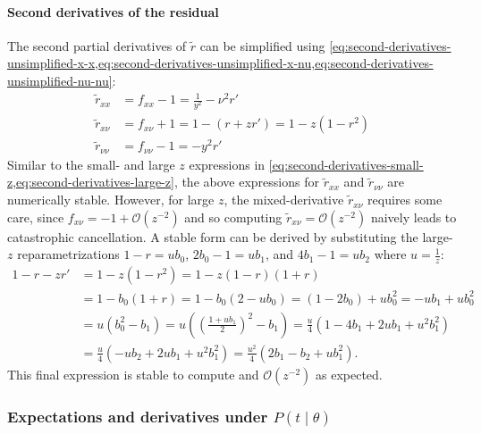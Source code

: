 \documentclass{article}
\begin{document}
\paragraph{Second derivatives of the residual}\label{sec:second-derivatives-residual}

The second partial derivatives of $\tilde{r}$ can be simplified using \cref{eq:second-derivatives-unsimplified-x-x,eq:second-derivatives-unsimplified-x-nu,eq:second-derivatives-unsimplified-nu-nu}:
%
\begin{align}
  \tilde{r}_{xx}     & = f_{xx} - 1 = \frac{1}{y^2} - \nu^2 r'          \\
  \tilde{r}_{x\nu}   & = f_{x\nu} + 1 = 1 - (r + z r') = 1 - z(1 - r^2) \\
  \tilde{r}_{\nu\nu} & = f_{\nu\nu} - 1 = - y^2 r'
\end{align}
%
Similar to the small- and large $z$ expressions in \cref{eq:second-derivatives-small-z,eq:second-derivatives-large-z}, the above expressions for $\tilde{r}_{xx}$ and $\tilde{r}_{\nu\nu}$ are numerically stable.
However, for large $z$, the mixed-derivative $\tilde{r}_{x\nu}$ requires some care, since $f_{x\nu} = -1 + \mathcal{O}(z^{-2})$ and so computing $\tilde{r}_{x\nu} = \mathcal{O}(z^{-2})$ naively leads to catastrophic cancellation.
A stable form can be derived by substituting the large-$z$ reparametrizations $1 - r = u b_0$, $2 b_0 - 1 = u b_1$, and $4 b_1 - 1 = u b_2$ where $u = \frac{1}{z}$:
%
\begin{align}
  1 - r - z r' & = 1 - z(1 - r^2) = 1 - z(1 - r)(1 + r)                                                                                            \\
               & = 1 - b_0 (1 + r) = 1 - b_0(2 - u b_0) = (1 - 2 b_0) + u b_0^2 = -u b_1 + u b_0^2                                                 \\
               & = u (b_0^2 - b_1) = u ((\frac{1 + u b_1}{2})^2 - b_1) = \frac{u}{4} (1 - 4b_1 + 2u b_1 + u^2 b_1^2)                               \\
               & = \frac{u}{4}(-u b_2 + 2u b_1 + u^2 b_1^2) = \frac{u^2}{4}(2 b_1 - b_2 + u b_1^2). \label{eq:one-minus-r-minus-z-r-prime-large-z}
\end{align}
%
This final expression is stable to compute and $\mathcal{O}(z^{-2})$ as expected.

\subsubsection{Expectations and derivatives under $P(t \mid \theta)$}
\end{document}
